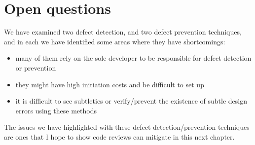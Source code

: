 \section{Open questions}

We have examined two defect detection, and two defect prevention techniques, and in each we have
identified some areas where they have shortcomings:
\begin{itemize}
	\item many of them rely on the sole developer to be responsible for defect detection or prevention
	\item they might have high initiation costs and be difficult to set up
	\item it is difficult to see subtleties or verify/prevent the existence of subtle design errors
		using these methods
\end{itemize}

The issues we have highlighted with these defect detection/prevention techniques are ones that I hope
to show code reviews can mitigate in this next chapter.
